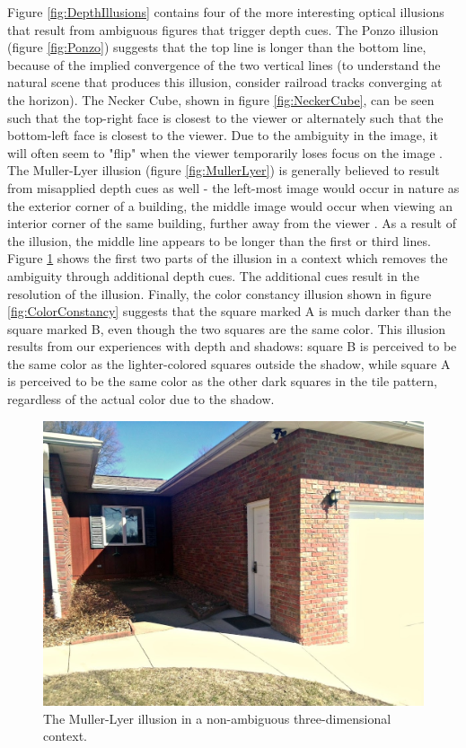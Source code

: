 \documentclass[11pt]{isuthesis}\usepackage[]{graphicx}\usepackage[]{color}
\begin{document}
Figure \ref{fig:DepthIllusions} contains four of the more interesting optical illusions that result from ambiguous figures that trigger depth cues. The Ponzo illusion (figure \ref{fig:Ponzo}) suggests that the top line is longer than the bottom line, because of the implied convergence of the two vertical lines (to understand the natural scene that produces this illusion, consider railroad tracks converging at the horizon). The Necker Cube, shown in figure \ref{fig:NeckerCube}, can be seen such that the top-right face is closest to the viewer or alternately such that the bottom-left face is closest to the viewer. Due to the ambiguity in the image, it will often seem to "flip" when the viewer temporarily loses focus on the image \citep{gregory1997knowledge}. The Muller-Lyer illusion (figure \ref{fig:MullerLyer}) is generally believed to result from misapplied depth cues as well - the left-most image would occur in nature as the exterior corner of a building, the middle image would occur when viewing an interior corner of the same building, further away from the viewer \citep{ward1977case, gregory1968perceptual, fisher1970experimental}. As a result of the illusion, the middle line appears to be longer than the first or third lines. Figure \ref{fig:mullerlyerhouse} shows the first two parts of the illusion in a context which removes the ambiguity through additional depth cues. The additional cues result in the resolution of the illusion. Finally, the color constancy illusion shown in figure \ref{fig:ColorConstancy} suggests that the square marked A is much darker than the square marked B, even though the two squares are the same color. This illusion results from our experiences with depth and shadows: square B is perceived to be the same color as the lighter-colored squares outside the shadow, while square A is perceived to be the same color as the other dark squares in the tile pattern, regardless of the actual color due to the shadow. 

\begin{figure}[htbp]\centering
\includegraphics[width=.5\linewidth]{mullerlyerhouse}
\caption[Muller Lyer Real World Context]{The Muller-Lyer illusion in a non-ambiguous three-dimensional context.}\label{fig:mullerlyerhouse}
\end{figure}
\end{document}
